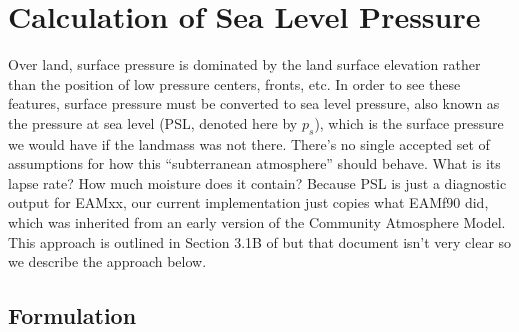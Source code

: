 \section{Calculation of Sea Level Pressure}

Over land, surface pressure is dominated by the land surface elevation rather than the position of low pressure centers, fronts, etc. In order to see these features, surface pressure must be converted to sea level pressure, also known as the pressure at sea level (PSL, denoted here by $p_s$), which is the surface pressure we would have if the landmass was not there. There's no single accepted set of assumptions for how this ``subterranean atmosphere'' should behave. What is its lapse rate? How much moisture does it contain? Because PSL is just a diagnostic output for EAMxx, our current implementation just copies what EAMf90 did, which was inherited from an early version of the Community Atmosphere Model. This approach is outlined in Section 3.1B of \cite{Trenberth_et93} but that document isn't very clear so we describe the approach below. 

\subsection{Formulation}


